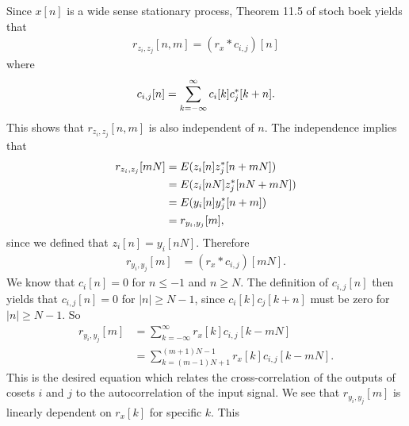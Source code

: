 \documentclass[a4paper, openany, oneside]{memoir}
\begin{document}
Since $x[n]$ is a wide sense stationary process, Theorem 11.5 of stoch boek yields that
\begin{align*}
    r_{z_i,z_j}[n,m] = (r_{x} \ast c_{i,j})[n]
\end{align*}
where
\begin{align*}
    c_{i,j}[n] = \sum_{k=-\infty}^{\infty}c_i[k] c^*_j[k+n].
\end{align*}
This shows that $r_{z_i,z_j}[n,m]$ is also independent of $n$. The independence implies that
\begin{align*}
    r_{z_i,z_j}[mN] &= E(z_i[n]z^*_j[n+mN]) \\
    &= E(z_i[nN]z^*_j[nN+mN]) \\
    &= E(y_i[n]y^*_j[n+m]) \\
    &= r_{y_i,y_j}[m],
\end{align*}
since we defined that $z_i[n]=y_i[nN]$. Therefore
\begin{align*}
    r_{y_i,y_j}[m] &= (r_{x} \ast c_{i,j})[mN].
\end{align*}
We know that $c_i[n]=0$ for $n \le -1$ and $n \ge N$. The definition of $c_{i,j}[n]$ then yields that $c_{i,j}[n]=0$ for $|n| \ge N-1$, since $c_i[k]c_j[k+n]$ must be zero for $|n| \ge N-1$. So
\begin{align*}
    r_{y_i,y_j}[m] &= \sum_{k=-\infty}^{\infty}r_{x}[k]c_{i,j}[k-mN] \\
    &= \sum_{k=(m-1)N+1}^{(m+1)N-1}r_{x}[k]c_{i,j}[k-mN].
\end{align*}
This is the desired equation which relates the cross-correlation of the outputs of cosets $i$ and $j$ to the autocorrelation of the input signal. We see that $r_{y_i,y_j}[m]$ is linearly dependent on $r_x[k]$ for specific $k$. This
\usetikzlibrary{calc}
\end{document}
